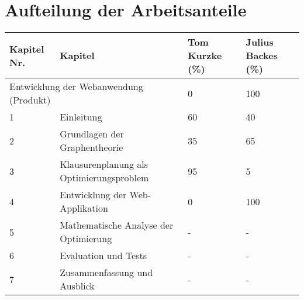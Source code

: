 \newpage
\section{Aufteilung der Arbeitsanteile}

\begin{longtable}{|p{3cm}|p{4cm}|p{4cm}|p{4cm}|}
\hline
\textbf{Kapitel Nr.} & \textbf{Kapitel} & \textbf{Tom Kurzke (\%)} & \textbf{Julius Backes (\%)} \\
\hline
\multicolumn{2}{|p{7cm}|}{Entwicklung der Webanwendung (Produkt)} & 0 & 100\\
\hline
1 & Einleitung & 60 & 40 \\
\hline
2 & Grundlagen der Graphentheorie & 35 & 65 \\
\hline
3 & Klausurenplanung als Optimierungsproblem & 95 & 5 \\
\hline
4 & Entwicklung der Web-Applikation & 0 & 100 \\
\hline
5 & Mathematische Analyse der Optimierung & - & - \\
\hline
6 & Evaluation und Tests & - & - \\
\hline
7 & Zusammenfassung und Ausblick & - & - \\
\hline
\end{longtable}